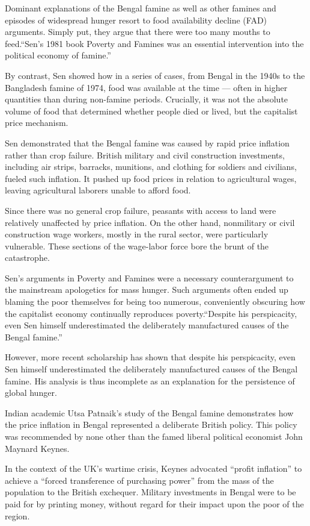 \documentclass[
]{book}
\begin{document}
Dominant explanations of the Bengal famine as well as other famines and episodes of widespread hunger resort to food availability decline (FAD) arguments. Simply put, they argue that there were too many mouths to feed.``Sen's 1981 book Poverty and Famines was an essential intervention into the political economy of famine.''

By contrast, Sen showed how in a series of cases, from Bengal in the 1940s to the Bangladesh famine of 1974, food was available at the time --- often in higher quantities than during non-famine periods. Crucially, it was not the absolute volume of food that determined whether people died or lived, but the capitalist price mechanism.

Sen demonstrated that the Bengal famine was caused by rapid price inflation rather than crop failure. British military and civil construction investments, including air strips, barracks, munitions, and clothing for soldiers and civilians, fueled such inflation. It pushed up food prices in relation to agricultural wages, leaving agricultural laborers unable to afford food.

Since there was no general crop failure, peasants with access to land were relatively unaffected by price inflation. On the other hand, nonmilitary or civil construction wage workers, mostly in the rural sector, were particularly vulnerable. These sections of the wage-labor force bore the brunt of the catastrophe.

Sen's arguments in Poverty and Famines were a necessary counterargument to the mainstream apologetics for mass hunger. Such arguments often ended up blaming the poor themselves for being too numerous, conveniently obscuring how the capitalist economy continually reproduces poverty.``Despite his perspicacity, even Sen himself underestimated the deliberately manufactured causes of the Bengal famine.''

However, more recent scholarship has shown that despite his perspicacity, even Sen himself underestimated the deliberately manufactured causes of the Bengal famine. His analysis is thus incomplete as an explanation for the persistence of global hunger.

Indian academic Utsa Patnaik's study of the Bengal famine demonstrates how the price inflation in Bengal represented a deliberate British policy. This policy was recommended by none other than the famed liberal political economist John Maynard Keynes.

In the context of the UK's wartime crisis, Keynes advocated ``profit inflation'' to achieve a ``forced transference of purchasing power'' from the mass of the population to the British exchequer. Military investments in Bengal were to be paid for by printing money, without regard for their impact upon the poor of the region.
\end{document}
